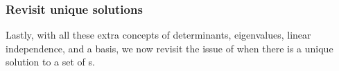 \subsubsection{Revisit unique solutions}
Lastly, with all these extra concepts of determinants, eigenvalues,  linear independence, and a basis, we now revisit the issue of when there is a unique solution to a set of s.


